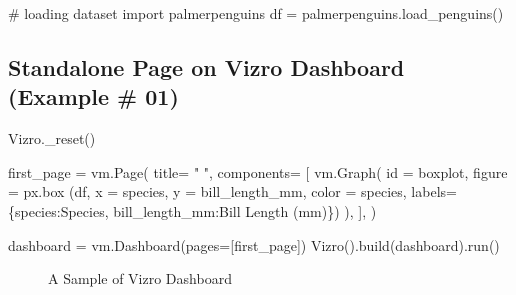 \documentclass[
  letterpaper,
  DIV=11,
  numbers=noendperiod]{scrreprt}
\newenvironment{Shaded}{\begin{snugshade}}{\end{snugshade}}
\newcommand{\BuiltInTok}[1]{\textcolor[rgb]{0.00,0.23,0.31}{#1}}
\newcommand{\CommentTok}[1]{\textcolor[rgb]{0.37,0.37,0.37}{#1}}
\newcommand{\ImportTok}[1]{\textcolor[rgb]{0.00,0.46,0.62}{#1}}
\newcommand{\NormalTok}[1]{\textcolor[rgb]{0.00,0.23,0.31}{#1}}
\newcommand{\OperatorTok}[1]{\textcolor[rgb]{0.37,0.37,0.37}{#1}}
\newcommand{\StringTok}[1]{\textcolor[rgb]{0.13,0.47,0.30}{#1}}
\begin{document}
\begin{Shaded}
\begin{Highlighting}[]
\CommentTok{\# loading dataset }
\ImportTok{import}\NormalTok{ palmerpenguins}
\NormalTok{df }\OperatorTok{=}\NormalTok{ palmerpenguins.load\_penguins()}
\end{Highlighting}
\end{Shaded}

\subsection{Standalone Page on Vizro Dashboard (Example \#
01)}\label{standalone-page-on-vizro-dashboard-example-01}

\begin{Shaded}
\begin{Highlighting}[]
\NormalTok{Vizro.\_reset()}

\NormalTok{first\_page }\OperatorTok{=}\NormalTok{ vm.Page(}
\NormalTok{    title}\OperatorTok{=} \StringTok{" "}\NormalTok{, }
\NormalTok{    components}\OperatorTok{=}\NormalTok{ [}
\NormalTok{        vm.Graph(}
            \BuiltInTok{id} \OperatorTok{=} \StringTok{\textquotesingle{}boxplot\textquotesingle{}}\NormalTok{, }
\NormalTok{            figure }\OperatorTok{=}\NormalTok{ px.box (df, x }\OperatorTok{=} \StringTok{\textquotesingle{}species\textquotesingle{}}\NormalTok{, y }\OperatorTok{=} \StringTok{\textquotesingle{}bill\_length\_mm\textquotesingle{}}\NormalTok{, }
\NormalTok{            color }\OperatorTok{=} \StringTok{\textquotesingle{}species\textquotesingle{}}\NormalTok{, }
\NormalTok{            labels}\OperatorTok{=}\NormalTok{\{}\StringTok{\textquotesingle{}species\textquotesingle{}}\NormalTok{:}\StringTok{\textquotesingle{}Species\textquotesingle{}}\NormalTok{, }\StringTok{\textquotesingle{}bill\_length\_mm\textquotesingle{}}\NormalTok{:}\StringTok{\textquotesingle{}Bill Length (mm)\textquotesingle{}}\NormalTok{\})}
\NormalTok{        ),}
\NormalTok{    ],}
\NormalTok{)}

\NormalTok{dashboard }\OperatorTok{=}\NormalTok{ vm.Dashboard(pages}\OperatorTok{=}\NormalTok{[first\_page])}
\NormalTok{Vizro().build(dashboard).run()}
\end{Highlighting}
\end{Shaded}

\begin{figure}


\caption{\label{fig-vizplot1}A Sample of Vizro Dashboard}

\end{figure}%
\end{document}
